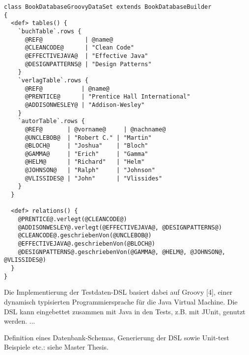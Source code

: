 \begin{lstlisting}[caption=DataSet modelliert mit dem Table Builder API, style=java, label=listing:dsl]
class BookDatabaseGroovyDataSet extends BookDatabaseBuilder
{
  <def> tables() {
    `buchTable`.rows {
      @REF@            | @name@
      @CLEANCODE@      | "Clean Code"      
      @EFFECTIVEJAVA@  | "Effective Java"  
      @DESIGNPATTERNS@ | "Design Patterns" 
    }
    `verlagTable`.rows {
      @REF@           | @name@
      @PRENTICE@      | "Prentice Hall International"
      @ADDISONWESLEY@ | "Addison-Wesley"
    }
    `autorTable`.rows {
      @REF@       | @vorname@     | @nachname@
      @UNCLEBOB@  | "Robert C." | "Martin"
      @BLOCH@     | "Joshua"    | "Bloch"
      @GAMMA@     | "Erich"     | "Gamma"
      @HELM@      | "Richard"   | "Helm"
      @JOHNSON@   | "Ralph"     | "Johnson"
      @VLISSIDES@ | "John"      | "Vlissides"    
    }
  }

  <def> relations() {
    @PRENTICE@.verlegt(@CLEANCODE@)
    @ADDISONWESLEY@.verlegt(@EFFECTIVEJAVA@, @DESIGNPATTERNS@)
    @CLEANCODE@.geschriebenVon(@UNCLEBOB@)
    @EFFECTIVEJAVA@.geschriebenVon(@BLOCH@)
    @DESIGNPATTERNS@.geschriebenVon(@GAMMA@, @HELM@, @JOHNSON@, @VLISSIDES@)
  }
}
\end{lstlisting}


Die Implementierung der Testdaten-DSL basiert dabei auf Groovy [4], einer dynamisch typisierten Programmiersprache für die Java Virtual Machine. Die DSL kann eingebettet zusammen mit Java in den Tests, z.B. mit JUnit, genutzt werden.
...

Definition eines Datenbank-Schemas, Generierung der DSL sowie Unit-test Beispiele etc.: siehe Master Thesis.



%
%
%
%	
%	
%	
%	
%
%	
%	
%	
%	
%	
	
